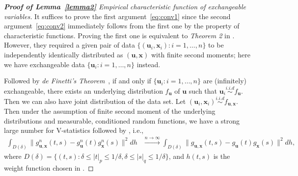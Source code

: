 \documentclass[11pt]{article}
\theoremstyle{definition}
\begin{document}
\begin{proof}[\textbf{Proof of Lemma~\ref{lemma2}} Empirical characteristic function of exchangeable variables] 
	\bigskip	
	It suffices to prove the first argument~\ref{eq:conv1} since the second argument~\ref{eq:conv2} immediately follows from the first one by the property of characteristic functions.
	Proving the first one is equivalent to \textit{Theorem 2} in \cite{szekely2007measuring}. However, they required a given pair of data $\{(\mathbf{u}_{i},\mathbf{x}_{i}) : i = 1, \ldots , n \}$ to be independently identically distributed as $(\mathbf{u},\mathbf{x})$ with finite second moments; here we have exchangeable data $\{  \mathbf{u}_{i} : i = 1, \ldots, n  \}$ instead. 
	
	Followed by \textit{de Finetti's Theorem}~\cite{diaconis1980finite}, if and only if $\{ \mathbf{u}_{i} : i = 1, \ldots, n \}$ are (infinitely) exchangeable, there exists an underlying distribution $f_{\mathbf{u}}$ of $\mathbf{u}$ such that $\mathbf{u}_{i}  \overset{i.i.d}{\sim} f_{\mathbf{u}} $. Then we can also have joint distribution of the data set. Let $(\mathbf{u}_{i}, \mathbf{x}_{i}) \overset{i.i.d}{\sim}   f_{\mathbf{u}, \mathbf{x}}$. Then under the assumption of finite second moment of the underlying distributions and measurable, conditioned random functions, we have a strong large number for V-statistics followed by \cite{szekely2007measuring}, i.e., 
	\begin{eqnarray}
	\displaystyle\int_{D(\delta)}{\|g_{\mathbf{u},\mathbf{x}}^{n}(t,s)-g_{\mathbf{u}}^{n}(t)g_{\mathbf{x}}^{n}(s)\|^{2}}dh &\stackrel{n \rightarrow \infty}{\longrightarrow} 
	\displaystyle\int_{D(\delta)}{\|g_{\mathbf{u},\mathbf{x}}(t,s)-g_{\mathbf{u}}(t)g_{\mathbf{x}}(s)\|^{2}}dh,
	\label{eq:SLLN}
	\end{eqnarray}
	where $D(\delta)=\{(t,s):\delta \leq |t|_{p} \leq 1/\delta,\delta \leq |s|_{q} \leq 1/\delta\}$, and $h(t,s)$ is the weight function chosen in \cite{szekely2007measuring}. 
\end{proof}
\end{document}
